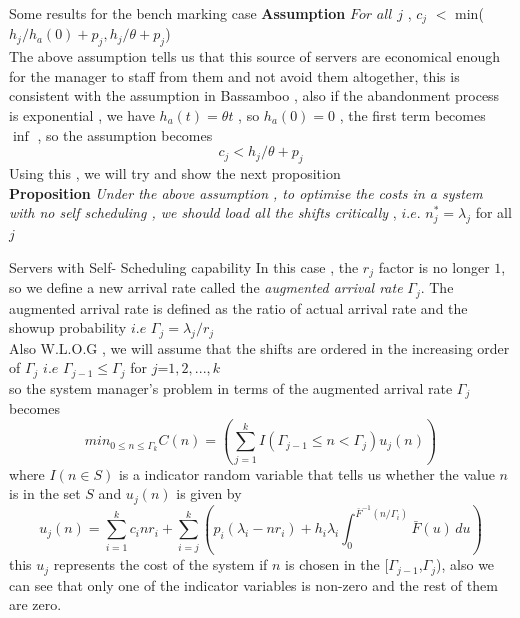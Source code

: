 \documentclass[9pt]{beamer}
\begin{document}
\begin{frame}{Some results for the bench marking case}
    \textbf{ Assumption} $For$ $all$ $j$ , $c_j$ $<$ min($h_j/h_a(0)+p_j,h_j/\theta+p_j$)
\\ The above assumption tells us that this source of servers are economical enough for the manager to staff from them and not avoid them altogether, this is consistent with the assumption in Bassamboo , also if the abandonment process is exponential , we have $h_a(t) = \theta t$ , so $h_a(0) =0$ , the first term becomes $\inf$ , so the assumption becomes
\begin{equation}
    c_j < h_j/\theta +p_j
\end{equation}
Using this , we will try and show the next proposition 
\\\textbf{Proposition} \textit {Under the above assumption , to optimise the costs in a system with no self scheduling , we should load all the shifts critically} , $i.e.$ $n_j^{*}=\lambda_j$ for all $j$
\end{frame}
\begin{frame}{Servers with Self- Scheduling capability}
     In this case , the $r_j$ factor is no longer $1$, so we define a new arrival rate called the \textit{augmented arrival rate} $\Gamma_j$.
 The augmented arrival rate is defined as the ratio of actual arrival rate and the showup probability $i.e$ $\Gamma_j = \lambda_j/r_j$
  \\Also W.L.O.G , we will assume that the shifts are ordered in the increasing order of $\Gamma_j$
 $i.e$ $\Gamma_{j-1} \leq \Gamma_{j}$ for $j$={$1,2,...,k$}
 \\so the system manager's problem in terms of the augmented arrival rate $\Gamma_j$ becomes 
\begin{equation}
      min_{0 \leq n \leq \Gamma_k} C(n) = \left( \sum_{j=1}^{k} {I(\Gamma_{j-1}\leq n <\Gamma_j)u_j(n)}\right)
\end{equation}
where $I(n \in S)$ is a indicator random variable that tells us whether the value $n$ is in the set $S$ and $u_j(n)$ is given by 
\begin{equation}
u_j(n)=\sum_{i=1}^{k}{c_inr_i}+\sum_{i=j}^{k}{\left ( p_i( \lambda_i-nr_i)+ h_i\lambda_i \int_{0}^{\bar{F}^{-1}(n/\Gamma_i)}  \bar{F}(u)  \, du \right)}
\end{equation}
this $u_j$ represents the cost of the system if $n$ is chosen in the [$\Gamma_{j-1}$,$\Gamma_j$), also we can see that only one of the indicator variables is non-zero and the rest of them are zero.
\end{frame}
\end{document}

